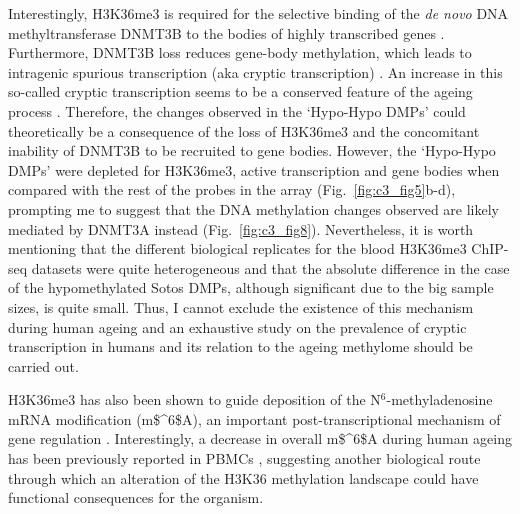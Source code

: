 \bigskip

Interestingly, H3K36me3 is required for the selective binding of the \textit{de novo} DNA methyltransferase DNMT3B to the bodies of highly transcribed genes \cite{Baubec2015}. Furthermore, DNMT3B loss reduces gene-body methylation, which leads to intragenic spurious transcription (aka cryptic transcription) \cite{Neri2017}. An increase in this so-called cryptic transcription seems to be a conserved feature of the ageing process \cite{Sen2015}. Therefore, the changes observed in the `Hypo-Hypo DMPs' could theoretically be a consequence of the loss of H3K36me3 and the concomitant inability of DNMT3B to be recruited to gene bodies. However, the `Hypo-Hypo DMPs' were depleted for H3K36me3, active transcription and gene bodies when compared with the rest of the probes in the array (Fig.~\ref{fig:c3_fig5}b-d), prompting me to suggest that the DNA methylation changes observed are likely mediated by DNMT3A instead (Fig.~\ref{fig:c3_fig8}). Nevertheless, it is worth mentioning that the different biological replicates for the blood H3K36me3 ChIP-seq datasets were quite heterogeneous and that the absolute difference in the case of the hypomethylated Sotos DMPs, although significant due to the big sample sizes, is quite small. Thus, I cannot exclude the existence of this mechanism during human ageing and an exhaustive study on the prevalence of cryptic transcription in humans and its relation to the ageing methylome should be carried out.

\bigskip

H3K36me3 has also been shown to guide deposition of the N$^6$-methyladenosine \acrshort{mRNA} modification (\acrshort{m$^6$A}), an important post-transcriptional mechanism of gene regulation \cite{Huang2019}. Interestingly, a decrease in overall \acrshort{m$^6$A} during human ageing has been previously reported in \acrshort{PBMC}s \cite{Min2018}, suggesting another biological route through which an alteration of the H3K36 methylation landscape could have functional consequences for the organism.

\bigskip

